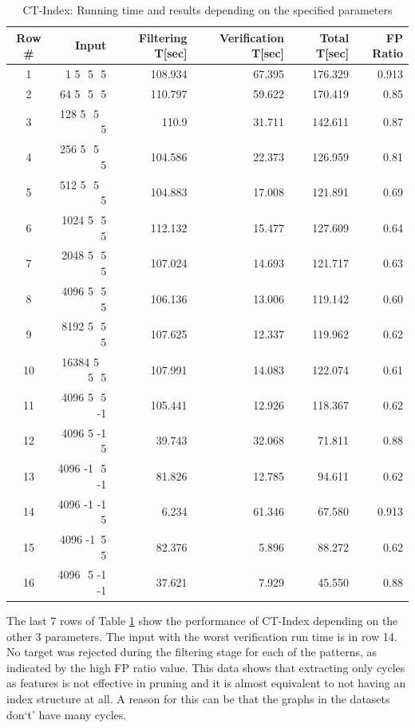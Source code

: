 \documentclass{l4proj}
\begin{document}
\begin{table}
\begin{center}
\renewcommand{\arraystretch}{1.2}%
\begin{tabular}{ |c|r|r|r|r|r|}\hline
 Row \# & Input & Filtering T[sec]& Verification T[sec]& Total T[sec] & FP Ratio\\
 \hline
  1 & 1 5 \,\,5 \,\,5 & 108.934  & 67.395 & 176.329 & 0.913 \\
 \hline
  2 & 64 5 \,\,5 \,\,5 & 110.797 & 59.622 & 170.419 & 0.85 \\
 \hline
  3 & 128 5 \,\,5 \,\,5 & 110.9 & 31.711 & 142.611 & 0.87 \\
 \hline
  4 & 256 5 \,\,5 \,\,5 & 104.586 & 22.373 & 126.959 & 0.81 \\
 \hline
  5 & 512 5 \,\,5 \,\,5 & 104.883 & 17.008 & 121.891 & 0.69 \\
 \hline
  6 & 1024 5 \,\,5 \,\,5 & 112.132 & 15.477 & 127.609 & 0.64 \\
 \hline
  7 & 2048 5 \,\,5 \,\,5 & 107.024 & 14.693 & 121.717 & 0.63 \\
 \hline
  8 & 4096 5 \,\,5 \,\,5 & 106.136 & 13.006 & 119.142 & 0.60 \\
 \hline
  9 & 8192 5 \,\,5 \,\,5 & 107.625 & 12.337 & 119.962 & 0.62 \\
 \hline
  10 & 16384 5 \,\,5 \,\,5 & 107.991 & 14.083 & 122.074 & 0.61 \\
 \hline
  11 & 4096 5 \,\,5 -1 & 105.441 & 12.926 & 118.367 & 0.62 \\
 \hline
  12 & 4096 5 -1 \,\,5 & 39.743 & 32.068 & 71.811 & 0.88 \\
 \hline
  13 & 4096 -1 \,\,5 -1 & 81.826 & 12.785 & 94.611 & 0.62 \\
 \hline
  14 & 4096 -1 -1 \,\,5 & 6.234 & 61.346 & 67.580 & 0.913 \\
 \hline 
  15 & 4096 -1 \,5 \,5  & 82.376 & 5.896 & 88.272 & 0.62\\ 
 \hline
  16 & 4096 \,\,5 -1 -1 & 37.621  & 7.929 & 45.550 & 0.88 \\ 
 \hline 
\end{tabular}
\caption{CT-Index: Running time and results depending on the specified parameters}
\label{table:runningTime}
\end{center}
\end{table}

The last 7 rows of Table \ref{table:runningTime} show the performance of CT-Index depending on the other 3 parameters. The input with the worst verification run time is in row 14. No target was rejected during the filtering stage for each of the patterns, as indicated by the high FP ratio value. This data shows that extracting only cycles as features is not effective in pruning and it is almost equivalent to not having an index structure at all. A reason for this can be that the graphs in the datasets don`t' have many cycles.
\end{document}

